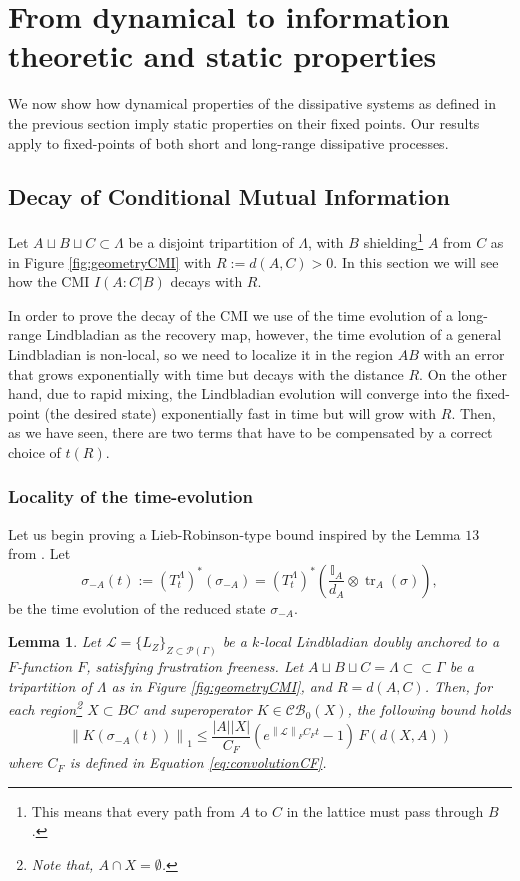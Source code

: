 \documentclass[11pt]{article}
\numberwithin{equation}{section}
\numberwithin{figure}{section}
\numberwithin{table}{section}
\theoremstyle{definition}
\theoremstyle{plain}
\newtheorem{lem}[thm]{Lemma}
\theoremstyle{remark}
\newcommand{\Id}{\mathbb{I}}
\newcommand{\Li}{\mathcal{L}}
\newcommand{\La}{\Lambda}
\newcommand{\G}{\Gamma}
\newcommand{\normm}[2]{\left\lVert#1\right\rVert_{#2}}
\newcommand{\tr}{\operatorname{tr}}
\newcommand{\abs}[1]{\left \vert#1\right\vert}
\begin{document}
\section{From dynamical to information theoretic and static properties}\label{sec:long-range}

We now show how dynamical properties of the dissipative systems as defined in the previous section imply static properties on their fixed points. Our results apply to fixed-points of both short and long-range dissipative processes. 



\subsection{Decay of Conditional Mutual Information} \label{sec:CMI}


Let $A\sqcup B\sqcup C\subset\Lambda$ be a disjoint tripartition of $\Lambda$, with $B$ shielding\footnote{This means that every path from $A$ to $C$ in the lattice must pass through $B$.} $A$ from $C$ as in Figure \ref{fig:geometryCMI} with $R:=d(A,C)>0$. In this section we will see how the CMI $I(A:C|B)$ decays with $R$.


In order to prove the decay of the CMI we use of the time evolution of a long-range Lindbladian as the recovery map, however, the time evolution of a general Lindbladian is non-local, so we need to localize it in the region $AB$ with an error that grows exponentially with time but decays with the distance $R$. On the other hand, due to rapid mixing, the Lindbladian evolution will converge into the fixed-point (the desired state) exponentially fast in time but will grow with $R$. Then, as we have seen, there are two terms that have to be compensated by a correct choice of $t(R)$.

\subsubsection{Locality of the time-evolution}


Let us begin proving a Lieb-Robinson-type bound inspired by the Lemma $13$ from \cite{brandao_area_2015}. Let \[\sigma_{-A}(t):=(T^\Lambda_t)^* (\sigma_{-A})=(T^\Lambda_t)^*\left (\dfrac{\Id_A}{d_A}\otimes \tr_A(\sigma)\right ) ,\]be the time evolution of the reduced state $\sigma_{-A}$.
\medskip
 \begin{lem}\label{lem:LiebRobinsonTypeBoundGeneral}
       Let $\Li=\{L_Z\}_{Z\subset \mathcal{P}(\G)}$ be a $k$-local Lindbladian doubly anchored to a $F$-function $F$, satisfying frustration freeness. Let $A\sqcup B\sqcup C=\La\subset \subset\G$ be a tripartition of $\La$ as in Figure \ref{fig:geometryCMI}, and $R=d(A,C)$. Then, for each region\footnote{Note that, $A\cap X=\emptyset$.} $X\subset BC$ and superoperator $K\in \mathcal{CB}_0(X)$, the following bound holds
        \begin{equation}
            \normm{K(\sigma_{-A}(t))}{1}\leq \dfrac{\abs{A}\abs{X}}{C_F} (e^{\normm{\Li}{F}C_Ft}-1) \, F(d(X,A)) 
        \end{equation}
        where $C_F$ is defined in Equation \eqref{eq:convolutionCF}.
    \end{lem}
  
\end{document}
